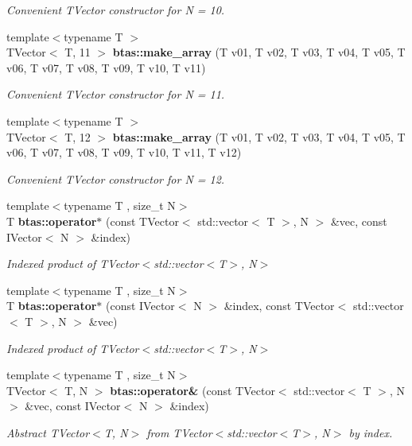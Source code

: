\begin{DoxyCompactItemize}
\begin{DoxyCompactList}\small\item\em Convenient T\-Vector constructor for N = 10. \end{DoxyCompactList}\item 
{\footnotesize template$<$typename T $>$ }\\T\-Vector$<$ T, 11 $>$ {\bf btas\-::make\-\_\-array} (T v01, T v02, T v03, T v04, T v05, T v06, T v07, T v08, T v09, T v10, T v11)
\begin{DoxyCompactList}\small\item\em Convenient T\-Vector constructor for N = 11. \end{DoxyCompactList}\item 
{\footnotesize template$<$typename T $>$ }\\T\-Vector$<$ T, 12 $>$ {\bf btas\-::make\-\_\-array} (T v01, T v02, T v03, T v04, T v05, T v06, T v07, T v08, T v09, T v10, T v11, T v12)
\begin{DoxyCompactList}\small\item\em Convenient T\-Vector constructor for N = 12. \end{DoxyCompactList}\item 
{\footnotesize template$<$typename T , size\-\_\-t N$>$ }\\T {\bf btas\-::operator$\ast$} (const T\-Vector$<$ std\-::vector$<$ T $>$, N $>$ \&vec, const I\-Vector$<$ N $>$ \&index)
\begin{DoxyCompactList}\small\item\em Indexed product of T\-Vector$<$std\-::vector$<$\-T$>$, N$>$ \end{DoxyCompactList}\item 
{\footnotesize template$<$typename T , size\-\_\-t N$>$ }\\T {\bf btas\-::operator$\ast$} (const I\-Vector$<$ N $>$ \&index, const T\-Vector$<$ std\-::vector$<$ T $>$, N $>$ \&vec)
\begin{DoxyCompactList}\small\item\em Indexed product of T\-Vector$<$std\-::vector$<$\-T$>$, N$>$ \end{DoxyCompactList}\item 
{\footnotesize template$<$typename T , size\-\_\-t N$>$ }\\T\-Vector$<$ T, N $>$ {\bf btas\-::operator\&} (const T\-Vector$<$ std\-::vector$<$ T $>$, N $>$ \&vec, const I\-Vector$<$ N $>$ \&index)
\begin{DoxyCompactList}\small\item\em Abstract T\-Vector$<$\-T, N$>$ from T\-Vector$<$std\-::vector$<$\-T$>$, N$>$ by index. \end{DoxyCompactList}\item 

\end{DoxyCompactItemize}
